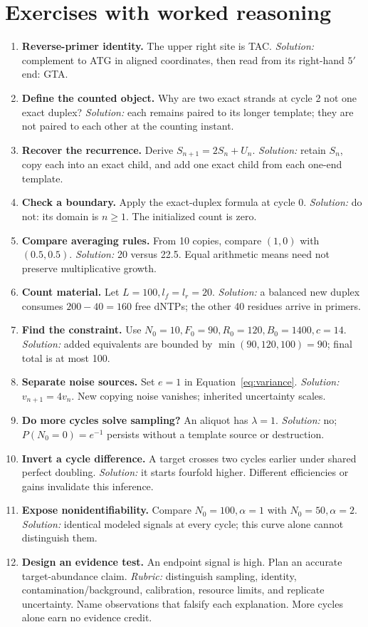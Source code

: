 \section{Exercises with worked reasoning}
\begin{enumerate}
\item \textbf{Reverse-primer identity.} The upper right site is TAC. \emph{Solution:} complement to ATG in aligned coordinates, then read from its right-hand $5'$ end: GTA.
\item \textbf{Define the counted object.} Why are two exact strands at cycle 2 not one exact duplex? \emph{Solution:} each remains paired to its longer template; they are not paired to each other at the counting instant.
\item \textbf{Recover the recurrence.} Derive $S_{n+1}=2S_n+U_n$. \emph{Solution:} retain $S_n$, copy each into an exact child, and add one exact child from each one-end template.
\item \textbf{Check a boundary.} Apply the exact-duplex formula at cycle 0. \emph{Solution:} do not: its domain is $n\geq1$. The initialized count is zero.
\item \textbf{Compare averaging rules.} From 10 copies, compare $(1,0)$ with $(0.5,0.5)$. \emph{Solution:} 20 versus 22.5. Equal arithmetic means need not preserve multiplicative growth.
\item \textbf{Count material.} Let $L=100,l_f=l_r=20$. \emph{Solution:} a balanced new duplex consumes $200-40=160$ free dNTPs; the other 40 residues arrive in primers.
\item \textbf{Find the constraint.} Use $N_0=10,F_0=90,R_0=120,B_0=1400,c=14$. \emph{Solution:} added equivalents are bounded by $\min(90,120,100)=90$; final total is at most 100.
\item \textbf{Separate noise sources.} Set $e=1$ in Equation~\ref{eq:variance}. \emph{Solution:} $v_{n+1}=4v_n$. New copying noise vanishes; inherited uncertainty scales.
\item \textbf{Do more cycles solve sampling?} An aliquot has $\lambda=1$. \emph{Solution:} no; $P(N_0=0)=e^{-1}$ persists without a template source or destruction.
\item \textbf{Invert a cycle difference.} A target crosses two cycles earlier under shared perfect doubling. \emph{Solution:} it starts fourfold higher. Different efficiencies or gains invalidate this inference.
\item \textbf{Expose nonidentifiability.} Compare $N_0=100,\alpha=1$ with $N_0=50,\alpha=2$. \emph{Solution:} identical modeled signals at every cycle; this curve alone cannot distinguish them.
\item \textbf{Design an evidence test.} An endpoint signal is high. Plan an accurate target-abundance claim. \emph{Rubric:} distinguish sampling, identity, contamination/background, calibration, resource limits, and replicate uncertainty. Name observations that falsify each explanation. More cycles alone earn no evidence credit.
\end{enumerate}

